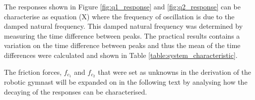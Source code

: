 The responses shown in Figure \ref{fig:q1_response} and \ref{fig:q2_response} can be characterise as equation (X) where the frequency of oscillation is due to the damped natural frequency. This damped natural frequency was determined by measuring the time difference between peaks. The practical results contains a variation on the time difference between peaks and thus the mean of the time differences were calculated and shown in Table \ref{table:system_characteristic}.\\

The friction forces, $f_{c_{1}}$ and $f_{c_{2}}$ that were set as unknowns in the derivation of the robotic gymnast will be expanded on in the following text by analysing how the decaying of the responses can be characterised.\\


